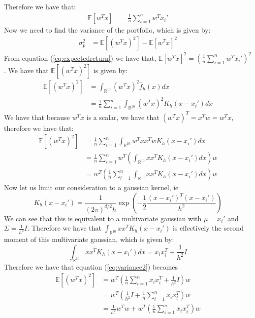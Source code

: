 \documentclass[12pt]{article}
\begin{document}
Therefore we have that:
\begin{align}
    \mathbb{E}[w^T x] &= \frac{1}{n} \sum_{i=1}^nw^T x_i'
    \label{eq:expectedreturn}
\end{align}
Now we need to find the variance of the portfolio, which is given by:
\begin{align}
    \sigma_p^2 & = \mathbb{E}[(w^T x)^2] - \mathbb{E}[w^T x]^2
    \label{eq:variance}
\end{align}
From equation (\ref{eq:expectedreturn}) we have that, $\mathbb{E}[w^T x]^2=\left(\frac{1}{n} \sum_{i=1}^nw^T x_i'\right)^2$.
We have that $\mathbb{E}[(w^T x)^2]$ is given by:
\begin{align}
    \mathbb{E}[(w^T x)^2] &= \int_{\mathbb{R}^{10}} (w^T x)^2 \hat{f}_h(x) dx \\
    &= \frac{1}{n} \sum_{i=1}^n\int_{\mathbb{R}^{10}} (w^T x)^2 K_h(x-x_i') dx
\end{align}
We have that because $w^Tx$ is a scalar, we have that $(w^Tx)^T=x^Tw=w^Tx$, therefore we have that:
\begin{align}
    \mathbb{E}[(w^T x)^2] &= \frac{1}{n} \sum_{i=1}^n\int_{\mathbb{R}^{10}} w^Txx^Tw K_h(x-x_i') dx \\
    &= \frac{1}{n} \sum_{i=1}^nw^T\left(\int_{\mathbb{R}^{10}} xx^T K_h(x-x_i') dx\right)w\\
    &= w^T\left(\frac{1}{n}\sum_{i=1}^n\int_{\mathbb{R}^{10}} xx^T K_h(x-x_i') dx\right)w
    \label{eq:variance2}
\end{align}
Now let us limit our consideration to a gaussian kernel, ie
\begin{equation}
    K_h(x-x_i') = \frac{1}{(2\pi)^{d/2}h} \exp\left(-\frac{1}{2} \frac{(x-x_i')^T(x-x_i')}{h^2}\right)
\end{equation}
We can see that this is equivalent to a multivariate gaussian with $\mu=x_i'$ and $\Sigma=\frac{1}{h^2}I$. Therefore we have that $\int_{\mathbb{R}^{10}} xx^T K_h(x-x_i')$
is effectively the second moment of this multivariate gaussian, which is given by:
\begin{equation}
    \int_{\mathbb{R}^{10}} xx^T K_h(x-x_i') dx = x_ix_i^T + \frac{1}{h^2}I
\end{equation}
Therefore we have that 
equation (\ref{eq:variance2}) becomes
\begin{align}
    \mathbb{E}[(w^T x)^2]
    &= w^T\left(\frac{1}{n}\sum_{i=1}^nx_ix_i^T + \frac{1}{h^2}I\right)w\\
    &=  w^T\left(\frac{1}{h^2}I+\frac{1}{n}\sum_{i=1}^nx_ix_i^T\right)w\\
    &=  \frac{1}{h^2}w^Tw + w^T\left(\frac{1}{n}\sum_{i=1}^nx_ix_i^T\right)w
\end{align}
\end{document}
